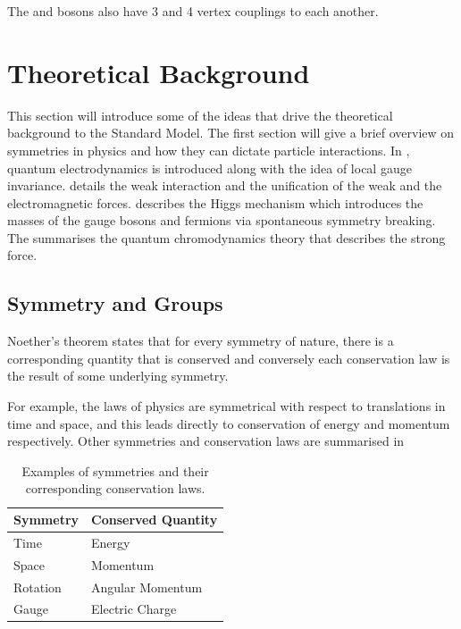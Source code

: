 The \PW and \PZ bosons also have 3 and 4 vertex couplings to each another.

\section{Theoretical Background}
\label{sec:forces}
This section will introduce some of the ideas that drive the
theoretical background to the Standard Model.
The first section will give a brief overview on symmetries in physics and how
they can dictate particle interactions. In , quantum
electrodynamics is introduced along with the idea of local gauge invariance.
 details the weak interaction and the unification of the weak 
and the electromagnetic forces.  describes the Higgs mechanism
which introduces the masses of the gauge bosons and fermions via spontaneous
symmetry breaking. The  summarises the quantum
chromodynamics theory that describes the strong force.

\subsection{Symmetry and Groups}
\label{sec:symmetry}
Noether's theorem states that for every symmetry of nature, there is
a corresponding quantity that is conserved and conversely each conservation law
is the result of some underlying symmetry.

For example, the laws of physics are symmetrical with respect to translations in
time and space, and this leads directly to conservation of energy and momentum
respectively. Other symmetries and conservation laws are summarised in

\begin{table}[htbp]
\begin{center}
\begin{tabular}{ l l }
Symmetry & Conserved Quantity \\ \hline
Time     & Energy \\
Space    & Momentum \\
Rotation & Angular Momentum \\
Gauge    & Electric Charge \\
\end{tabular}
\caption{Examples of symmetries and their corresponding conservation laws.
\label{tab:symmetry}}
\end{center}
\end{table}

